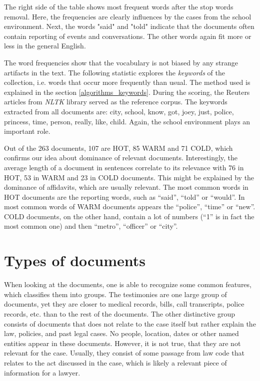 \documentclass[
  digital, %
  notable,   %
  nolof,     %
  nolot,     %
]{fithesis3}
\begin{document}
The right side of the table shows most frequent words after the stop words removal.
Here, the frequencies are clearly influences by the cases from the school environment.
Next, the words "said" and "told" indicate that the documents often contain reporting of events and conversations.
The other words again fit more or less in the general English.

The word frequencies show that the vocabulary is not biased by any strange artifacts in the text.
The following statistic explores the \textit{keywords} of the collection, i.e. words that occur more frequently than usual.
The method used is explained in the section \ref{algorithms_keywords}.
During the scoring, the Reuters articles from \textit{NLTK} library served as the reference corpus.
The keywords extracted from all documents are: city, school, know, got, joey, just, police, princess, time, person, really, like, child.
Again, the school environment plays an important role.

Out of the 263 documents, 107 are HOT, 85 WARM and 71 COLD, which confirms our idea about dominance of relevant documents.
Interestingly, the average length of a document in sentences correlate to its relevance with 76 in HOT, 53 in WARM and 23 in COLD documents.
This might be explained by the dominance of affidavits, which are usually relevant.
The most common words in HOT documents are the reporting words, such as ``said'', ``told'' or ``would''. 
In most common words of WARM documents appears the ``police'', ``time'' or ``new''.
COLD documents, on the other hand, contain a lot of numbers (``1'' is in fact the most common one) and then ``metro'', ``officer'' or ``city''.

\section{Types of documents}
When looking at the documents, one is able to recognize some common features, which classifies them into groups.
The testimonies are one large group of documents, yet they are closer to medical records, bills, call transcripts, police records, etc. than to the rest of the documents.
The other distinctive group consists of documents that does not relate to the case itself but rather explain the law, policies, and past legal cases.
No people, location, dates or other named entities appear in these documents.
However, it is not true, that they are not relevant for the case.
Usually, they consist of some passage from law code that relates to the act discussed in the case, which is likely a relevant piece of information for a lawyer.
\end{document}
